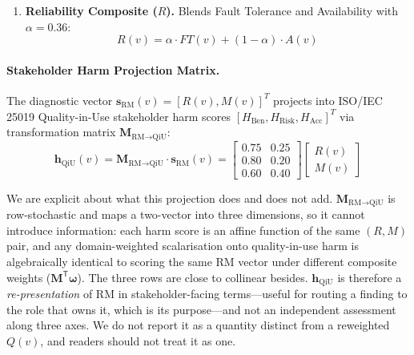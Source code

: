 \begin{enumerate}
    \begin{equation}
    \begin{aligned}
    \mathrm{CouplingRisk\_enh}(v) &= \min\!\big(1,\; \big[1 - |2\iota(v) - 1|\big]\,(1 + 0.10\,\mathrm{PC}(v))\big) \\
    M(v) = & \; 0.35\,\mathrm{BT}(v) + 0.30\,w_{\text{out}}(v) + 0.15\,\mathrm{CQP}(v) \\
           & + 0.12\,\mathrm{CouplingRisk\_enh}(v) + 0.08\,(1-\mathrm{CC}(v))
    \end{aligned}
    \end{equation}
    \item \textbf{Reliability Composite ($R$).} Blends Fault Tolerance and Availability with $\alpha = 0.36$:
    \begin{equation}
    R(v) = \alpha \cdot FT(v) + (1-\alpha) \cdot A(v)
    \end{equation}
\end{enumerate}

\paragraph{Stakeholder Harm Projection Matrix.}
The diagnostic vector $\mathbf{s}_{\text{RM}}(v) = [R(v), M(v)]^T$ projects into ISO/IEC 25019 Quality-in-Use stakeholder harm scores $[H_{\text{Ben}}, H_{\text{Risk}}, H_{\text{Acc}}]^T$ via transformation matrix $\mathbf{M}_{\text{RM} \to \text{QiU}}$:
\begin{equation}
\mathbf{h}_{\text{QiU}}(v) = \mathbf{M}_{\text{RM} \to \text{QiU}} \cdot \mathbf{s}_{\text{RM}}(v) = \begin{bmatrix} 0.75 & 0.25 \\ 0.80 & 0.20 \\ 0.60 & 0.40 \end{bmatrix} \begin{bmatrix} R(v) \\ M(v) \end{bmatrix}
\end{equation}

We are explicit about what this projection does and does not add. $\mathbf{M}_{\text{RM} \to \text{QiU}}$
is row-stochastic and maps a two-vector into three dimensions, so it cannot introduce information:
each harm score is an affine function of the same $(R, M)$ pair, and any domain-weighted
scalarisation onto quality-in-use harm is algebraically identical to scoring the same RM vector
under different composite weights ($\mathbf{M}^{\mathsf T}\boldsymbol{\omega}$). The three rows are
close to collinear besides. $\mathbf{h}_{\text{QiU}}$ is therefore a \emph{re-presentation} of RM in
stakeholder-facing terms---useful for routing a finding to the role that owns it, which is its
purpose---and not an independent assessment along three axes. We do not report it as a quantity
distinct from a reweighted $Q(v)$, and readers should not treat it as one.

